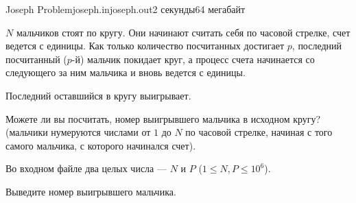 \begin{problem}{Joseph Problem}{joseph.in}{joseph.out}{2 секунды}{64 мегабайт}{}

$N$ мальчиков стоят по кругу. Они начинают считать себя по часовой стрелке, счет ведется с единицы.
Как только количество посчитанных достигает $p$, последний посчитанный ($p$-й) мальчик покидает круг,
а процесс счета начинается со следующего за ним мальчика и вновь ведется с единицы.

Последний оставшийся в кругу выигрывает.

Можете ли вы посчитать, номер выигрывшего мальчика в исходном кругу? (мальчики нумеруются 
числами от $1$ до $N$ по часовой стрелке, начиная
с того самого мальчика, с которого начинался счет).

\InputFile

Во входном файле два целых числа --- $N$ и $P$ ($1 \le N, P \le 10^6$).

\OutputFile

Выведите номер выигрывшего мальчика.

\Example

\begin{example}
%
\end{example}

\end{problem}
